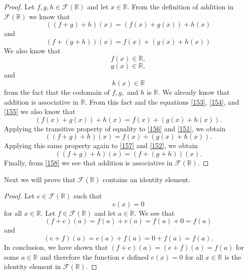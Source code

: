 \documentclass[11pt,a4paper]{article}
\begin{document}
\begin{proof}
Let $f,g,h\in\mathcal{F}(\mathbb{R})$ and let $x\in\mathbb{R}$. From the definition of addition in $\mathcal{F}(\mathbb{R})$ we know that
\begin{equation}\label{151}
((f+g)+h)(x) = (f(x)+g(x))+h(x)
\end{equation}
and
\begin{equation}\label{152}
(f+(g+h))(x) = f(x)+(g(x)+h(x))
\end{equation}
We also know that
\begin{equation}\label{153}
f(x) \in \mathbb{R},
\end{equation}
\begin{equation}\label{154}
g(x) \in \mathbb{R},
\end{equation}
and
\begin{equation}\label{155}
h(x) \in \mathbb{R}
\end{equation}
from the fact that the codomain of $f,g,$ and $h$ is $\mathbb{R}$.
We already know that addition is associative in $\mathbb{R}$. From this fact and the equations \eqref{153}, \eqref{154}, and \eqref{155} we also know that
\begin{equation}\label{156}
(f(x)+g(x))+h(x) = f(x)+(g(x)+h(x)).
\end{equation}
Applying the transitive property of equality to \eqref{156} and \eqref{151}, we obtain
\begin{equation}\label{157}
((f+g)+h)(x) = f(x)+(g(x)+h(x)).
\end{equation}
Applying this same property again to \eqref{157} and \eqref{152}, we obtain
\begin{equation}\label{158}
((f+g)+h)(x) = (f+(g+h))(x).
\end{equation}
Finally, from \eqref{158} we see that addition is associative in $\mathcal{F}(\mathbb{R})$.
\end{proof}
Next we will prove that $\mathcal{F}(\mathbb{R})$ contains an identity element.
\begin{proof}
Let $e\in\mathcal{F}(\mathbb{R})$ such that 
\begin{equation}
e(x) = 0
\end{equation}
for all $x\in\mathbb{R}$. Let $f\in\mathcal{F}(\mathbb{R})$ and let $a\in\mathbb{R}$. We see that
\[(f+e)(a) = f(a)+e(a)=f(a)+0=f(a)\]
and
\[(e+f)(a) = e(a)+f(a)=0+f(a)=f(a).\]
In conclusion, we have shown that $(f+e)(a)=(e+f)(a)=f(a)$ for some $a\in\mathbb{R}$ and therefore the function $e$ defined $e(x)=0$ for all $x\in\mathbb{R}$ is the identity element in $\mathcal{F}(\mathbb{R})$.
\end{proof}
\end{document}
